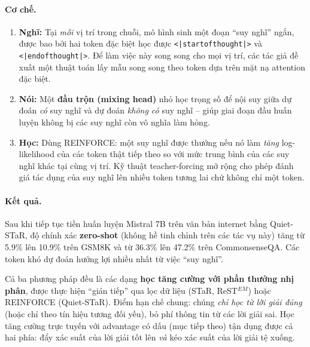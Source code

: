 \paragraph{Cơ chế.}
\begin{enumerate}
	\item \textbf{Nghĩ:} Tại \emph{mỗi} vị trí trong chuỗi, mô hình sinh một đoạn “suy nghĩ” ngắn, được bao bởi hai token đặc biệt học được \texttt{<|startofthought|>} và \texttt{<|endofthought|>}. Để làm việc này song song cho mọi vị trí, các tác giả đề xuất một thuật toán lấy mẫu song song theo token dựa trên mặt nạ attention đặc biệt.
	\item \textbf{Nói:} Một \textbf{đầu trộn (mixing head)} nhỏ học trọng số để nội suy giữa dự đoán \emph{có} suy nghĩ và dự đoán \emph{không có} suy nghĩ -- giúp giai đoạn đầu huấn luyện không bị các suy nghĩ còn vô nghĩa làm hỏng.
	\item \textbf{Học:} Dùng REINFORCE: một suy nghĩ được thưởng nếu nó làm \emph{tăng} log-likelihood của các token thật tiếp theo so với mức trung bình của các suy nghĩ khác tại cùng vị trí. Kỹ thuật teacher-forcing mở rộng cho phép đánh giá tác dụng của suy nghĩ lên nhiều token tương lai chứ không chỉ một token.
\end{enumerate}

\paragraph{Kết quả.} Sau khi tiếp tục tiền huấn luyện Mistral 7B trên văn bản internet bằng Quiet-STaR, độ chính xác \textbf{zero-shot} (không hề tinh chỉnh trên các tác vụ này) tăng từ 5.9\% lên 10.9\% trên GSM8K và từ 36.3\% lên 47.2\% trên CommonsenseQA. Các token khó dự đoán hưởng lợi nhiều nhất từ việc “suy nghĩ”.

\begin{tcolorbox}[title={Từ tự học đến học tăng cường}, colback=blue!5!white, colframe=blue!60!black, fonttitle=\bfseries]
Cả ba phương pháp đều là các dạng \textbf{học tăng cường với phần thưởng nhị phân}, được thực hiện “gián tiếp” qua lọc dữ liệu (STaR, ReST$^{EM}$) hoặc REINFORCE (Quiet-STaR). Điểm hạn chế chung: chúng \emph{chỉ học từ lời giải đúng} (hoặc chỉ theo tín hiệu tương đối yếu), bỏ phí thông tin từ các lời giải sai. Học tăng cường trực tuyến với advantage có dấu (mục tiếp theo) tận dụng được cả hai phía: đẩy xác suất của lời giải tốt lên \emph{và} kéo xác suất của lời giải tệ xuống.
\end{tcolorbox}
